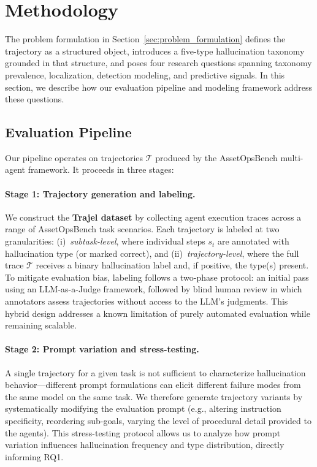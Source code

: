 \documentclass{article}
\begin{document}
\section{Methodology}
\label{sec:methodology}

The problem formulation in Section~\ref{sec:problem_formulation} defines the trajectory as a structured object, introduces a five-type hallucination taxonomy grounded in that structure, and poses four research questions spanning taxonomy prevalence, localization, detection modeling, and predictive signals. In this section, we describe how our evaluation pipeline and modeling framework address these questions.

\subsection{Evaluation Pipeline}
\label{sec:pipeline}

Our pipeline operates on trajectories $\mathcal{T}$ produced by the AssetOpsBench multi-agent framework. It proceeds in three stages:

\paragraph{Stage 1: Trajectory generation and labeling.}
We construct the \textbf{Trajel dataset} by collecting agent execution traces across a range of AssetOpsBench task scenarios. Each trajectory is labeled at two granularities: (i)~\emph{subtask-level}, where individual steps $s_t$ are annotated with hallucination type (or marked correct), and (ii)~\emph{trajectory-level}, where the full trace $\mathcal{T}$ receives a binary hallucination label and, if positive, the type(s) present. To mitigate evaluation bias, labeling follows a two-phase protocol: an initial pass using an LLM-as-a-Judge framework, followed by blind human review in which annotators assess trajectories without access to the LLM's judgments. This hybrid design addresses a known limitation of purely automated evaluation while remaining scalable.

\paragraph{Stage 2: Prompt variation and stress-testing.}
A single trajectory for a given task is not sufficient to characterize hallucination behavior---different prompt formulations can elicit different failure modes from the same model on the same task. We therefore generate trajectory variants by systematically modifying the evaluation prompt (e.g., altering instruction specificity, reordering sub-goals, varying the level of procedural detail provided to the agents). This stress-testing protocol allows us to analyze how prompt variation influences hallucination frequency and type distribution, directly informing RQ1.
\end{document}
